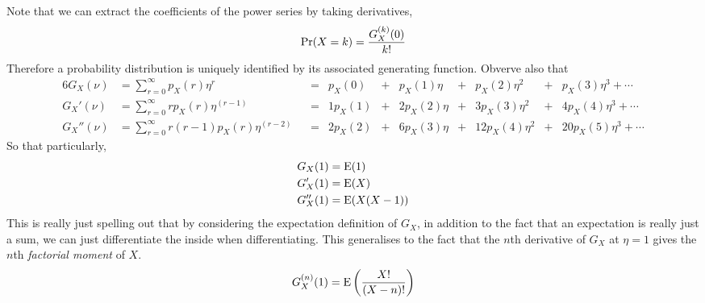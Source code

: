 Note that we can extract the coefficients of the power series by taking
derivatives,
\begin{equation*}
\operatorname{Pr}(X = k) = \frac{G_X^{(k)}(0)}{k!}
\end{equation*}
Therefore a probability distribution is uniquely identified by its associated
generating function. Obverve also that
\begin{alignat*}6
G_X(\nu) &= \sum_{r = 0}^\infty p_X(r)\eta^r
    &&={}& p_X(0) &+{}& p_X(1)\eta
    &+{}& p_X(2)\eta^2 &+{}& p_X(3) \eta^3 + \dotsb \\
G_X'(\nu) &= \sum_{r = 0}^\infty rp_X(r)\eta^{(r - 1)}
    &&={}& 1 p_X(1) &+{}& 2p_X(2)\eta
    &+{}& 3p_X(3) \eta^2 &+{}& 4p_X(4) \eta^3 + \dotsb \\
G_X''(\nu) &= \sum_{r = 0}^\infty r(r - 1)p_X(r)\eta^{(r - 2)}
    &&={}& 2 p_X(2) &+{}& 6p_X(3)\eta
    &+{}& 12p_X(4) \eta^2 &+{}& 20p_X(5) \eta^3 + \dotsb
\end{alignat*}
So that particularly,
\begin{align*}
G_X(1) &= \operatorname{E}(1) \\
G_X'(1) &= \operatorname{E}(X) \\
G_X''(1) &= \operatorname{E}(X(X - 1))
\end{align*}
This is really just spelling out that by considering the expectation definition
of \(G_X\), in addition to the fact that an expectation is really just a sum, we
can just differentiate the inside when differentiating. This generalises to the
fact that the \(n\)th derivative of \(G_X\) at \(\eta = 1\) gives the \(n\)th
\emph{factorial moment} of \(X\).
\begin{equation*}
G_X^{(n)}(1) = \Expect\pqty{\frac{X!}{(X - n)!}}
\end{equation*}

